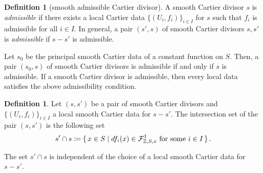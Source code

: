 \documentclass[a4paper,dvipdfmx,reqno,12pt]{amsart}
\theoremstyle{definition}
\newtheorem{definition}[theorem]{Definition}
\newcommand{\deq}{\coloneqq}
\numberwithin{equation}{section}
\begin{document}
\begin{definition}[{smooth admissible Cartier divisor}]
\label{definition-admissible-smooth-cartier-divisor}
A smooth Cartier divisor $s$ is \emph{admissible} 
if there exists a local Cartier data $\{(U_i,f_i)\}_{i\in I}$ 
for $s$
such that $f_i$ is admissible for all $i\in I$. 
In general, a pair $(s',s)$ of smooth 
Cartier divisors $s,s'$ is 
\emph{admissible} if $s-s'$ is 
admissible. 
\end{definition}

Let $s_0$ be the principal smooth Cartier data of 
a constant function on $S$. Then, a pair 
$(s_0,s)$ of smooth Cartier divisors is admissible
if and only if $s$ is admissible.
If a smooth Cartier divisor is admissible, 
then every local data satisfies the above 
admissibility condition.

\begin{definition}
Let $(s,s')$ be a pair of smooth Cartier divisors and 
$\{(U_i,f_i)\}_{i\in I}$ a local smooth Cartier data
for $s-s'$. The intersection set of the pair 
$(s,s')$ is the following set
\begin{align}
s'\cap s\deq \set{x\in S \mid  df_i(x)\in 
\mathcal{F}^{1}_{\mathbb{Z},S,x} 
\text{ for some } i\in I}.
\end{align}
\end{definition}

The set $s'\cap s$ is independent of the choice of 
a local smooth Cartier data for $s-s'$. 

\end{document}
